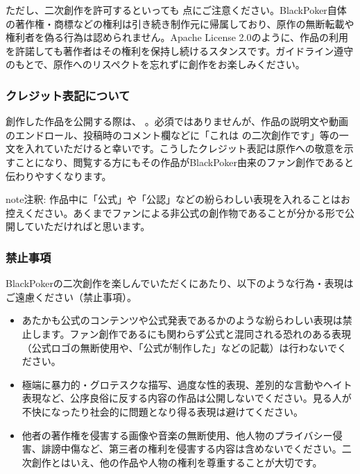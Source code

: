 \documentclass[letterpaper,10pt,dvipdfmx]{sphinxmanual}
\begin{document}
\sphinxAtStartPar
ただし、二次創作を許可するといっても  点にご注意ください。BlackPoker自体の著作権・商標などの権利は引き続き制作元に帰属しており、原作の無断転載や権利者を偽る行為は認められません。Apache License 2.0のように、作品の利用を許諾しても著作者はその権利を保持し続けるスタンスです。ガイドライン遵守のもとで、原作へのリスペクトを忘れずに創作をお楽しみください。


\subsubsection{クレジット表記について}
\label{\detokenize{appendix/guideline/fanworks:id5}}
\sphinxAtStartPar
創作した作品を公開する際は、  。必須ではありませんが、作品の説明文や動画のエンドロール、投稿時のコメント欄などに「これは  の二次創作です」等の一文を入れていただけると幸いです。こうしたクレジット表記は原作への敬意を示すことになり、閲覧する方にもその作品がBlackPoker由来のファン創作であると伝わりやすくなります。

\begin{sphinxadmonition}{note}{注釈:}
\sphinxAtStartPar
作品中に「公式」や「公認」などの紛らわしい表現を入れることはお控えください。あくまでファンによる非公式の創作物であることが分かる形で公開していただければと思います。
\end{sphinxadmonition}


\subsubsection{禁止事項}
\label{\detokenize{appendix/guideline/fanworks:id6}}
\sphinxAtStartPar
BlackPokerの二次創作を楽しんでいただくにあたり、以下のような行為・表現はご遠慮ください（禁止事項）。
\begin{itemize}
\item {} 
\sphinxAtStartPar
{}
あたかも公式のコンテンツや公式発表であるかのような紛らわしい表現は禁止します。ファン創作であるにも関わらず公式と混同される恐れのある表現（公式ロゴの無断使用や、「公式が制作した」などの記載）は行わないでください。

\item {} 
\sphinxAtStartPar
{}
極端に暴力的・グロテスクな描写、過度な性的表現、差別的な言動やヘイト表現など、公序良俗に反する内容の作品は公開しないでください。見る人が不快になったり社会的に問題となり得る表現は避けてください。

\item {} 
\sphinxAtStartPar
{}
他者の著作権を侵害する画像や音楽の無断使用、他人物のプライバシー侵害、誹謗中傷など、第三者の権利を侵害する内容は含めないでください。二次創作とはいえ、他の作品や人物の権利を尊重することが大切です。

\end{itemize}
\end{document}
